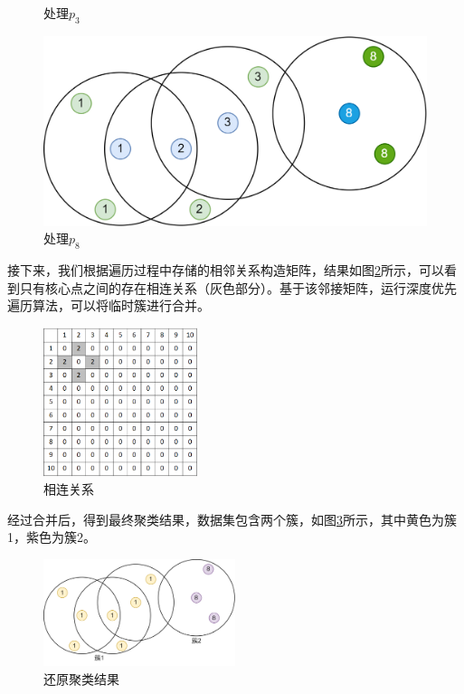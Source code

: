 \documentclass[12pt, a4paper, oneside]{ctexart}
\begin{document}
\begin{figure}[htbp]
\begin{minipage}[t]{0.24\linewidth}
	\caption{处理$ p_3 $}
	\label{db3}
	\end{minipage}
\hfill
	\begin{minipage}[t]{0.24\linewidth}
	\centering
	\includegraphics[width=\linewidth]{../img/db5.png}
	\caption{处理$ p_8 $}
	\label{db4}
	\end{minipage}
\end{figure}

接下来，我们根据遍历过程中存储的相邻关系构造矩阵，结果如图\ref{db_matrix}所示，可以看到只有核心点之间的存在相连关系（灰色部分）。基于该邻接矩阵，运行深度优先遍历算法，可以将临时簇进行合并。

\begin{figure}[htbp]
	\centering
	\includegraphics[width=0.4\textwidth]{../img/db_matrix.png}
	\caption{相连关系}
	\label{db_matrix}
\end{figure}

经过合并后，得到最终聚类结果，数据集包含两个簇，如图\ref{dbres}所示，其中黄色为簇1，紫色为簇2。

\begin{figure}[htbp]
	\centering
	\includegraphics[width=0.5\textwidth]{../img/dbres.png}
	\caption{还原聚类结果}
	\label{dbres}
\end{figure}
\end{document}
